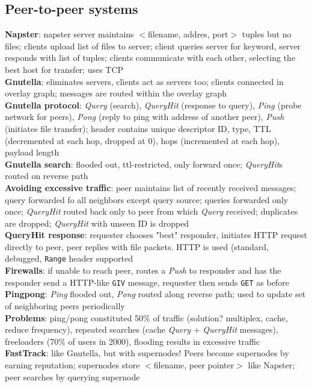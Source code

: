 \documentclass{article}
\begin{document}
\begin{multicols*}{3}
\section{Peer-to-peer systems}
\textbf{Napster}: napster server maintains $<$filename, addres, port$>$ tuples but no files; clients upload list of files to server; client queries server for keyword, server responds with list of tuples; clients communicate with each other, selecting the best host for transfer; uses TCP \\
\textbf{Gnutella}: eliminates servers, clients act as servers too; clients connected in overlay graph; messages are routed within the overlay graph \\
\textbf{Gnutella protocol}: \textit{Query} (search), \textit{QueryHit} (response to query), \textit{Ping} (probe network for peers), \textit{Pong} (reply to ping with address of another peer), \textit{Push} (initiates file transfer); header contains unique descriptor ID, type, TTL (decremented at each hop, dropped at 0), hops (incremented at each hop), payload length \\
\textbf{Gnutella search}: flooded out, ttl-restricted, only forward once; \textit{QueryHit}s routed on reverse path \\
\textbf{Avoiding excessive traffic}: peer maintains list of recently received messages; query forwarded fo all neighbors except query source; queries forwarded only once; \textit{QueryHit} routed back only to peer from which \textit{Query} received; duplicates are dropped; \textit{QueryHit} with unseen ID is dropped \\
\textbf{QueryHit response}: requester chooses "best" responder, initiates HTTP request directly to peer, peer replies with file packets. HTTP is used (standard, debugged, \texttt{Range} header supported \\
\textbf{Firewalls}: if unable to reach peer, routes a \textit{Push} to responder and has the responder send a HTTP-like \texttt{GIV} message, requester then sends \texttt{GET} as before \\
\textbf{Pingpong}: \textit{Ping} flooded out, \textit{Pong} routed along reverse path; used to update set of neighboring peers periodically \\
\textbf{Problems}: ping/pong constituted 50\% of traffic (solution? multiplex, cache, reduce frequency), repeated searches (cache \textit{Query} + \textit{QueryHit} messages), freeloaders (70\% of users in 2000), flooding results in excessive traffic \\
\textbf{FastTrack}: like Gnutella, but with supernodes! Peers become supernodes by earning reputation; supernodes store $<$filename, peer pointer$>$ like Napster; peer searches by querying supernode \\

\end{multicols*}
\end{document}
